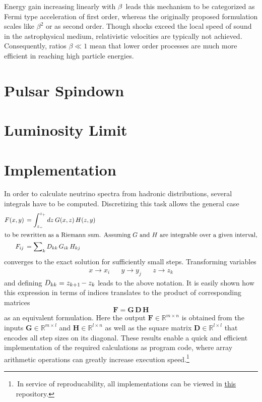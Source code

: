 Energy gain increasing linearly with $\kern-0.5pt \beta \kern+1.0pt$ leads this mechanism to be categorized as Fermi type acceleration
of first order, whereas the originally proposed formulation scales like $\beta^2$ or as second order. Though shocks exceed the local
speed of sound in the astrophysical medium, relativistic velocities are typically not achieved. Consequently, ratios $\beta \ll 1$ mean
that lower order processes are much more efficient in reaching high particle energies.



\section{Pulsar Spindown}
\label{sec:spindown}



\section{Luminosity Limit}
\label{sec:luminosity}



\section{Implementation}
\label{sec:implementation}

In order to calculate neutrino spectra from hadronic distributions, several integrals have to be computed. Discretizing
this task allows the general case
\begin{align*}
	F(x, y) \kern+1.5pt &= \int_{z_{-}}^{z_{+}} dz \: G(x, z) \, H(z, y) \\
	\intertext{to be rewritten as a Riemann sum. Assuming $G$ and $H$ are integrable over a given interval,}
	F_{ij} \kern+1.8pt &= \sum\nolimits_k D_{kk} \, G_{ik} \, H_{kj}
\end{align*}
converges to the exact solution for sufficiently small steps. Transforming variables
\begin{align*}
	&&&& x \rightarrow x_i && y \rightarrow y_j && z \rightarrow z_k &&&&
\end{align*}
and defining $D_{kk} = z_{k+1} \kern-1.0pt - z_k$ leads to the above notation. It is easily shown how this expression in terms of
indices translates to the product of corresponding matrices
\begin{equation*}
	\bm{F} = \bm{G} \, \bm{D} \, \bm{H}
\end{equation*}
as an equivalent formulation. Here the output $\bm{F} \in \mathbb{R}^{m \times n}$ is obtained from the inputs
$\bm{G} \in \mathbb{R}^{m \times l}$ and $\bm{H} \in \mathbb{R}^{l \times n}$ as well as the square matrix
$\bm{D} \in \mathbb{R}^{l \times l}$ that encodes all step sizes on its diagonal. These results enable a quick and
efficient implementation of the required calculations as program code, where array arithmetic operations can greatly
increase execution speed.\footnote{$\,$In service of reproducability, all implementations can be viewed in
\href{https://github.com/fritzali/bachelor}{this} repository.}
